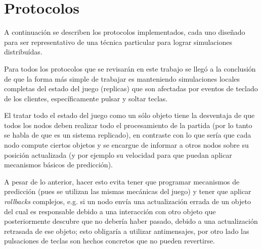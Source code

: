 \section{Protocolos}





A continuación se describen los protocolos implementados, cada uno diseñado para ser representativo de una técnica particular para lograr simulaciones distribuídas.

Para todos los protocolos que se revisarán en este trabajo se llegó a la conclusión de que la forma más simple de trabajar es manteniendo simulaciones locales completas del estado del juego (replicas) que son afectadas por eventos de teclado de los clientes, específicamente pulsar y soltar teclas.

El tratar todo el estado del juego como un sólo objeto tiene la desventaja de que todos los nodos deben realizar todo el procesamiento de la partida (por lo tanto se habla de que es un sistema replicado), en contraste con lo que sería que cada nodo compute ciertos objetos y se encargue de informar a otros nodos sobre su posición actualizada (y por ejemplo su velocidad para que puedan aplicar mecanismos básicos de predicción).


A pesar de lo anterior, hacer esto evita tener que programar mecanismos de predicción (pues se utilizan las mismas mecánicas del juego) y tener que aplicar \emph{rollbacks} complejos, e.g. si un nodo envía una actualización errada de un objeto del cual es responsable debido a una interacción con otro objeto que posteriormente descubre que no debería haber pasado, debido a una actualización retrasada de ese objeto; esto obligaría a utilizar antimensajes, por otro lado las pulsaciones de teclas son hechos concretos que no pueden revertirse.

